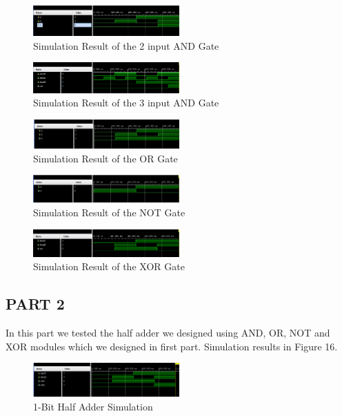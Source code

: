\documentclass[pdftex,12pt,a4paper]{article}
\begin{document}
\begin{figure}[H]\label{fig6}
	\centering
	\includegraphics[width=0.5\textwidth]{and_gate_result.jpeg}	
	\caption{Simulation Result of the 2 input AND Gate}
	
\end{figure}
\begin{figure}[H]\label{fig6}
	\centering
	\includegraphics[width=0.5\textwidth]{andgate3input_sim.png}	
	\caption{Simulation Result of the 3 input AND Gate}
	
\end{figure}
\begin{figure}[H]
	\centering
	\includegraphics[width=0.5\textwidth]{or_gate_result.jpeg}	
	\caption{Simulation Result of the OR Gate}
	\label{fig7}
\end{figure}
\begin{figure}[H]
	\centering
	\includegraphics[width=0.5\textwidth]{not_gate_result.jpeg}	
	\caption{Simulation Result of the NOT Gate}
    \label{fig8}
\end{figure}
\begin{figure}[H]
	\centering
	\includegraphics[width=0.5\textwidth]{xorgate_sim.png}	
	\caption{Simulation Result of the XOR Gate}
    \label{fig8}
\end{figure}
\subsection{PART 2}
In this part we tested the half adder we designed using AND, OR, NOT and XOR modules which we designed in first part. Simulation results in Figure 16.
\begin{figure}[H]
    \centering
    \includegraphics[width=0.5\textwidth]{halfadder_sim.png}
    \caption{1-Bit Half Adder Simulation}
\end{figure}
\end{document}
